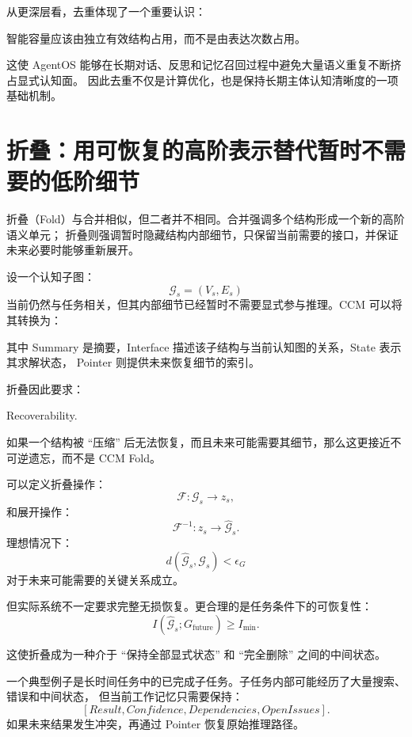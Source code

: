 从更深层看，去重体现了一个重要认识：
\begin{statementbox}
智能容量应该由独立有效结构占用，而不是由表达次数占用。
\end{statementbox}

这使 AgentOS 能够在长期对话、反思和记忆召回过程中避免大量语义重复不断挤占显式认知面。
因此去重不仅是计算优化，也是保持长期主体认知清晰度的一项基础机制。


\section{折叠：用可恢复的高阶表示替代暂时不需要的低阶细节}

折叠（Fold）与合并相似，但二者并不相同。合并强调多个结构形成一个新的高阶语义单元；
折叠则强调暂时隐藏结构内部细节，只保留当前需要的接口，并保证未来必要时能够重新展开。

设一个认知子图：
\[
\mathcal G_s=(V_s,E_s)
\]
当前仍然与任务相关，但其内部细节已经暂时不需要显式参与推理。CCM 可以将其转换为：
\begin{statementbox}
\centering
{}
\end{statementbox}

其中 Summary 是摘要，Interface 描述该子结构与当前认知图的关系，State 表示其求解状态，
Pointer 则提供未来恢复细节的索引。

折叠因此要求：
\begin{statementbox}
Recoverability.
\end{statementbox}
如果一个结构被 ``压缩'' 后无法恢复，而且未来可能需要其细节，那么这更接近不可逆遗忘，而不是 CCM Fold。

可以定义折叠操作：
\[
\mathcal F:
\mathcal G_s
\rightarrow
z_s,
\]
和展开操作：
\[
\mathcal F^{-1}:
z_s
\rightarrow
\widehat{\mathcal G}_s.
\]
理想情况下：
\[
d(
\widehat{\mathcal G}_s,
\mathcal G_s
)
<\epsilon_G
\]
对于未来可能需要的关键关系成立。

但实际系统不一定要求完整无损恢复。更合理的是任务条件下的可恢复性：
\[
I(
\widehat{\mathcal G}_s;
G_{\mathrm{future}}
)
\ge
I_{\min}.
\]

这使折叠成为一种介于 ``保持全部显式状态'' 和 ``完全删除'' 之间的中间状态。

一个典型例子是长时间任务中的已完成子任务。子任务内部可能经历了大量搜索、错误和中间状态，
但当前工作记忆只需要保持：
\[
[
Result,
Confidence,
Dependencies,
OpenIssues
].
\]
如果未来结果发生冲突，再通过 Pointer 恢复原始推理路径。

